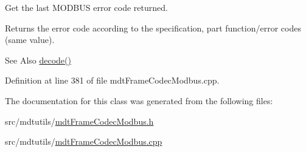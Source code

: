 Get the last M\-O\-D\-B\-U\-S error code returned. 

Returns the error code according to the specification, part function/error codes (same value). \begin{DoxySeeAlso}{See Also}
\hyperlink{classmdt_frame_codec_modbus_a426f465363a49d70890a462b40677787}{decode()} 
\end{DoxySeeAlso}


Definition at line 381 of file mdt\-Frame\-Codec\-Modbus.\-cpp.



The documentation for this class was generated from the following files\-:\begin{DoxyCompactItemize}
\item 
src/mdtutils/\hyperlink{mdt_frame_codec_modbus_8h}{mdt\-Frame\-Codec\-Modbus.\-h}\item 
src/mdtutils/\hyperlink{mdt_frame_codec_modbus_8cpp}{mdt\-Frame\-Codec\-Modbus.\-cpp}\end{DoxyCompactItemize}
